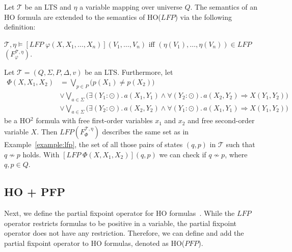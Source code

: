 \begin{definition}
    Let $\mathcal{T}$ be an LTS and $\eta$ a variable mapping over universe $Q$. The
    semantics of an HO formula are extended to the semantics of HO($\mathit{LFP}$) via the following definition:
    \begin{compactitem}
        \item $\mathcal{T}, \eta \models [\mathit{LFP}\;\varphi(X, X_1, \dots, X_n)](V_1, \dots,
        V_n)$ iff $(\eta(V_1), \dots, \eta(V_n)) \in \mathit{LFP}$ $(F_\varphi^{\mathcal{T}, \eta})$.
    \end{compactitem}
\end{definition}

\begin{example}
    \label{example:ho_lfp} 
    Let $\mathcal{T} = (Q, \Sigma, P, \Delta, v)$ be an LTS. Furthermore, let 
\begin{align*}
\Phi(X, X_1, X_2) &= \underset{p\in P}{\bigvee} \big(p(X_1) \neq p(X_2)\big)\\&
 \vee \underset{a\in\Sigma}{\bigvee} \big(\exists (Y_1 \colon \odot).\, a(X_1, Y_1) \wedge \forall (Y_2 
 \colon \odot).\, a(X_2,Y_2) \Rightarrow X(Y_1, Y_2)\big) \\&
\vee \underset{a\in\Sigma}{\bigvee} \big(\exists (Y_2 \colon \odot).\, a(X_2, Y_2) \wedge \forall (Y_1 
\colon \odot).\, a(X_1,Y_1) \Rightarrow X(Y_1, Y_2)\big)
\end{align*}
be a HO$^2$ formula with free first-order variables $x_1$ and $x_2$ and free second-order variable $X$.
Then $LFP(F_\Phi^{\mathcal{T}, \eta})$ describes the same set as in Example~\ref{example:lfp}, the set of all those pairs of states $(q, p)$ in $\mathcal{T}$ such that $q\not\sim p$ holds. With $[LFP\; \Phi(X, X_1, X_2)](q, p)$ we can check if $q \not\sim p$, where $q, p \in Q$. 
\end{example}

\subsection{HO + PFP}\label{subsec:ho+Pfp}

Next, we define the partial fixpoint operator for HO formulas~\cite{schewe2006fixpoint}. While the
$\mathit{LFP}$ operator restricts formulas to be positive in a variable, the partial fixpoint operator does not have any
restriction. Therefore, we can define and
add the partial fixpoint operator to HO formulas, denoted as HO($\mathit{PFP}$).

